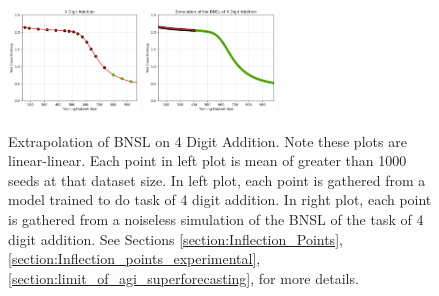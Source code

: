 \documentclass{article} %
\begin{document}
\begin{figure}[htbp]
    \centering


\includegraphics[width=0.31\textwidth]{figures/arithmetic/4_digit_addition__dataset_size.png}
\includegraphics[width=0.31\textwidth]{figures/arithmetic/4_digit_addition__dataset_size__very_first_version__simulation_limit.png}
\vspace{-4.7mm}
    \caption{
    Extrapolation of BNSL on 4 Digit Addition. Note these plots are linear-linear. Each point in left plot is mean of greater than 1000 seeds at that dataset size. In left plot, each point is gathered from a model trained to do task of 4 digit addition. In right plot, each point is gathered from a noiseless simulation of the BNSL of the task of 4 digit addition. See Sections \ref{section:Inflection_Points}, \ref{section:Inflection_points_experimental}, \ref{section:limit_of_agi_superforecasting}, for more details.
    }
    \label{fig:arithmetic}
\end{figure}
\vspace{-3.0mm}
\FloatBarrier

\vspace{-4.0mm}
\end{document}
